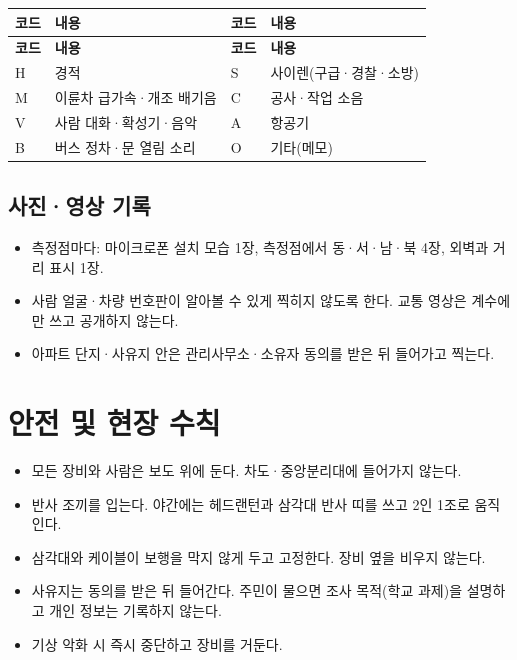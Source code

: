 \documentclass[10.5pt,a4paper]{article}
\newcommand{\hd}[1]{\cellcolor{headfill}\textbf{\sffamily #1}}
\begin{document}
\small
\begin{longtable}{>{\centering\arraybackslash}p{}>{\raggedright\arraybackslash}p{}>{\centering\arraybackslash}p{}>{\raggedright\arraybackslash}p{}}
\toprule
\hd{코드} & \hd{내용} & \hd{코드} & \hd{내용} \\ \midrule
\endfirsthead
\toprule
\hd{코드} & \hd{내용} & \hd{코드} & \hd{내용} \\ \midrule
\endhead
\bottomrule
\endlastfoot
H & 경적 & S & 사이렌(구급·경찰·소방) \\ \midrule
M & 이륜차 급가속·개조 배기음 & C & 공사·작업 소음 \\ \midrule
V & 사람 대화·확성기·음악 & A & 항공기 \\ \midrule
B & 버스 정차·문 열림 소리 & O & 기타(메모) \\
\end{longtable}
\addtocounter{table}{-1}
\normalsize
{}\subsection{사진·영상 기록}
\begin{itemize}
\item 측정점마다: 마이크로폰 설치 모습 1장, 측정점에서 동·서·남·북 4장, 외벽과 거리 표시 1장.
\item 사람 얼굴·차량 번호판이 알아볼 수 있게 찍히지 않도록 한다. 교통 영상은 계수에만 쓰고 공개하지 않는다.
\item 아파트 단지·사유지 안은 관리사무소·소유자 동의를 받은 뒤 들어가고 찍는다.
\end{itemize}
\section{안전 및 현장 수칙}
\begin{itemize}
\item 모든 장비와 사람은 보도 위에 둔다. 차도·중앙분리대에 들어가지 않는다.
\item 반사 조끼를 입는다. 야간에는 헤드랜턴과 삼각대 반사 띠를 쓰고 2인 1조로 움직인다.
\item 삼각대와 케이블이 보행을 막지 않게 두고 고정한다. 장비 옆을 비우지 않는다.
\item 사유지는 동의를 받은 뒤 들어간다. 주민이 물으면 조사 목적(학교 과제)을 설명하고 개인 정보는 기록하지 않는다.
\item 기상 악화 시 즉시 중단하고 장비를 거둔다.
\end{itemize}
\end{document}
